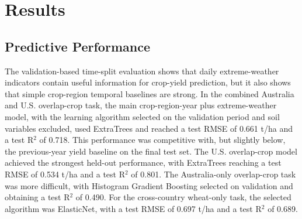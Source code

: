 \documentclass[11pt,a4paper]{article}
\begin{document}
\begin{table}[H]
\centering
\caption{Diagnostic baseline and feature-group ablation for the combined Australia and U.S. overlap-crop task. Feature-group rows retain crop, country, region, and year identifiers unless they are explicit baselines; named weather groups add the stated weather features and exclude soil except in the weather-plus-soil row. Within each row, the learning algorithm is selected by validation performance, then refitted and evaluated on the 2016--2021 test period.}
\label{tab:feature_group_ablation}
\scriptsize
\setlength{\tabcolsep}{3pt}
\renewcommand{\arraystretch}{1.08}

\end{table}

\section{Results}
\subsection{Predictive Performance}
The validation-based time-split evaluation shows that daily extreme-weather indicators contain useful information for crop-yield prediction, but it also shows that simple crop-region temporal baselines are strong. In the combined Australia and U.S. overlap-crop task, the main crop-region-year plus extreme-weather model, with the learning algorithm selected on the validation period and soil variables excluded, used ExtraTrees and reached a test RMSE of 0.661 t/ha and a test R$^2$ of 0.718. This performance was competitive with, but slightly below, the previous-year yield baseline on the final test set. The U.S. overlap-crop model achieved the strongest held-out performance, with ExtraTrees reaching a test RMSE of 0.534 t/ha and a test R$^2$ of 0.801. The Australia-only overlap-crop task was more difficult, with Histogram Gradient Boosting selected on validation and obtaining a test R$^2$ of 0.490. For the cross-country wheat-only task, the selected algorithm was ElasticNet, with a test RMSE of 0.697 t/ha and a test R$^2$ of 0.689.
\end{document}
